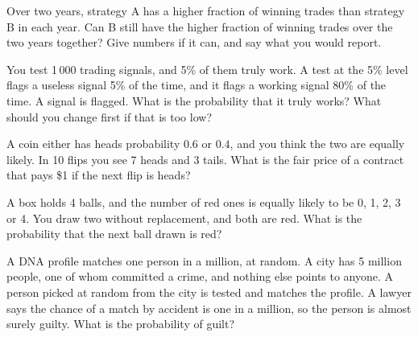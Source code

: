 \begin{question}\label{iq:iv1:conditional-probability-and-bayes:15}
Over two years, strategy A has a higher fraction of winning trades than strategy B in each year. Can B still have the higher fraction of winning trades over the two years together? Give numbers if it can, and say what you would report.
\end{question}

\begin{question}\label{iq:iv1:conditional-probability-and-bayes:16}
You test 1\,000 trading signals, and 5\% of them truly work. A test at the 5\% level flags a useless signal 5\% of the time, and it flags a working signal 80\% of the time. A signal is flagged. What is the probability that it truly works? What should you change first if that is too low?
\end{question}

\begin{question}\label{iq:iv1:conditional-probability-and-bayes:17}
A coin either has heads probability $0.6$ or $0.4$, and you think the two are equally likely. In 10 flips you see 7 heads and 3 tails. What is the fair price of a contract that pays \$1 if the next flip is heads?
\end{question}

\begin{question}\label{iq:iv1:conditional-probability-and-bayes:18}
A box holds 4 balls, and the number of red ones is equally likely to be 0, 1, 2, 3 or 4. You draw two without replacement, and both are red. What is the probability that the next ball drawn is red?
\end{question}

\begin{question}\label{iq:iv1:conditional-probability-and-bayes:19}
A DNA profile matches one person in a million, at random. A city has 5 million people, one of whom committed a crime, and nothing else points to anyone. A person picked at random from the city is tested and matches the profile. A lawyer says the chance of a match by accident is one in a million, so the person is almost surely guilty. What is the probability of guilt?
\end{question}

